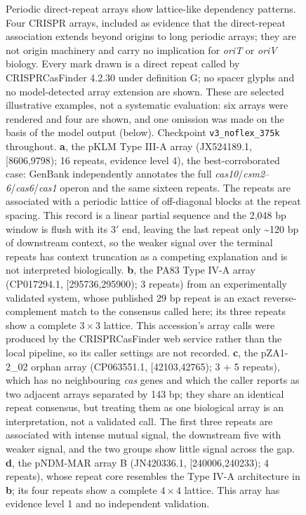 \begin{figure}[h]
    \centering
\caption{
Periodic direct-repeat arrays show lattice-like dependency patterns. Four CRISPR arrays, included as evidence that the direct-repeat association extends beyond origins to long periodic arrays; they are not origin machinery and carry no implication for \emph{oriT} or \emph{oriV} biology. Every mark drawn is a direct repeat called by CRISPRCasFinder 4.2.30 under definition G; no spacer glyphs and no model-detected array extension are shown. These are selected illustrative examples, not a systematic evaluation: six arrays were rendered and four are shown, and one omission was made on the basis of the model output (below). Checkpoint \texttt{v3\_noflex\_375k} throughout. \textbf{a}, the pKLM Type III-A array (JX524189.1, [8606,9798); 16 repeats, evidence level 4), the best-corroborated case: GenBank independently annotates the full \emph{cas10}/\emph{csm2}--\emph{6}/\emph{cas6}/\emph{cas1} operon and the same sixteen repeats. The repeats are associated with a periodic lattice of off-diagonal blocks at the repeat spacing. This record is a linear partial sequence and the 2,048 bp window is flush with its 3$'$ end, leaving the last repeat only \textasciitilde{}120 bp of downstream context, so the weaker signal over the terminal repeats has context truncation as a competing explanation and is not interpreted biologically. \textbf{b}, the PA83 Type IV-A array (CP017294.1, [295736,295900); 3 repeats) from an experimentally validated system, whose published 29 bp repeat is an exact reverse-complement match to the consensus called here; its three repeats show a complete $3\times3$ lattice. This accession's array calls were produced by the CRISPRCasFinder web service rather than the local pipeline, so its caller settings are not recorded. \textbf{c}, the pZA1-2\_02 orphan array (CP063551.1, [42103,42765); 3 + 5 repeats), which has no neighbouring \emph{cas} genes and which the caller reports as two adjacent arrays separated by 143 bp; they share an identical repeat consensus, but treating them as one biological array is an interpretation, not a validated call. The first three repeats are associated with intense mutual signal, the downstream five with weaker signal, and the two groups show little signal across the gap. \textbf{d}, the pNDM-MAR array B (JN420336.1, [240006,240233); 4 repeats), whose repeat core resembles the Type IV-A architecture in \textbf{b}; its four repeats show a complete $4\times4$ lattice. This array has evidence level 1 and no independent validation.
}
\label{fig:supp-crispr}
\end{figure}


